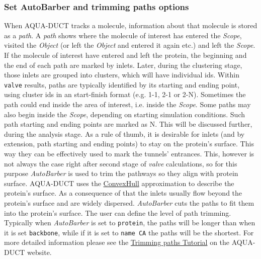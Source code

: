 \documentclass[9pt,tutorial, pubversion]{livecoms}
\begin{document}
\subsubsection{Set AutoBarber and trimming paths options}
When AQUA-DUCT tracks a molecule, information about that molecule is stored as a \emph{path}. A \emph{path} shows where the molecule of interest has entered the \emph{Scope}, visited the \emph{Object} (or left the \emph{Object} and entered it again etc.) and left the \emph{Scope}. If the molecule of interest have entered and left the protein, the beginning and the end of each path are marked by inlets. Later, during the clustering stage, those inlets are grouped into clusters, which will have individual ids. Within \texttt{valve} results, paths are typically identified by its starting and ending point, using cluster ids in an start-finish format (e.g. 1-1, 2-1 or 2-N). Sometimes the path could end inside the area of interest, i.e. inside the \emph{Scope}. Some paths may also begin inside the \emph{Scope}, depending on starting simulation conditions. Such path starting and ending points are marked as N. This will be discussed further, during the analysis stage. As a rule of thumb, it is desirable for inlets (and by extension, path starting and ending points) to stay on the protein’s surface. This way they can be effectively used to mark the tunnels’ entrances. This, however is not always the case right after second stage of \emph{valve} calculations, so for this purpose \emph{AutoBarber} is used to trim the pathways so they align with protein surface. AQUA-DUCT uses the \href{https://tunneling-group.github.io/aqua-duct/valve/valve_manual.html?highlight=paths#convex-hulls-of-macromolecule-atoms}{ConvexHull} approximation to describe the protein’s surface. As a consequence of that the inlets usually flow beyond the protein’s surface and are widely dispersed. \emph{AutoBarber} cuts the paths to fit them into the protein’s surface. The user can define the level of path trimming. Typically when \textit{AutoBarber} is set to \texttt{protein}, the paths will be longer than when it is set \texttt{backbone}, while if it is set to \texttt{name CA} the paths will be the shortest. For more detailed information please see the \href{http://www.aquaduct.pl/trimming-paths/}{Trimming paths Tutorial} on the AQUA-DUCT website.
\end{document}
